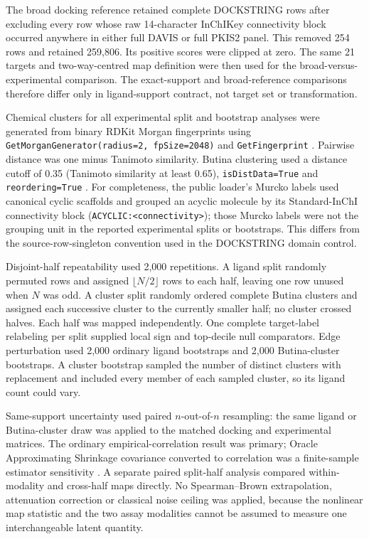 The broad docking reference retained complete DOCKSTRING rows after excluding
every row whose raw 14-character InChIKey connectivity block occurred anywhere
in either full DAVIS or full PKIS2 panel.  This removed 254 rows and retained
259,806.  Its positive scores were clipped at zero.  The same 21 targets and
two-way-centred map definition were then used for the broad-versus-experimental
comparison.  The exact-support and broad-reference comparisons therefore
differ only in ligand-support contract, not target set or transformation.

Chemical clusters for all experimental split and bootstrap analyses were
generated from binary RDKit Morgan fingerprints using
\texttt{GetMorganGenerator(radius=2, fpSize=2048)} and
\texttt{GetFingerprint} \cite{morgan1965,rogers2010,rdkit2025}.  Pairwise
distance was one minus Tanimoto similarity.  Butina clustering used a distance
cutoff of 0.35 (Tanimoto similarity at least 0.65),
\texttt{isDistData=True} and \texttt{reordering=True} \cite{butina1999}.  For
completeness, the public loader's Murcko labels used canonical cyclic scaffolds
and grouped an acyclic molecule by its Standard-InChI connectivity block
(\texttt{ACYCLIC:<connectivity>}); those Murcko labels were not the grouping
unit in the reported experimental splits or bootstraps.  This differs from the
source-row-singleton convention used in the DOCKSTRING domain control.

Disjoint-half repeatability used 2,000 repetitions.  A ligand split randomly
permuted rows and assigned $\lfloor N/2\rfloor$ rows to each half, leaving one
row unused when $N$ was odd.  A cluster split randomly ordered complete Butina
clusters and assigned each successive cluster to the currently smaller half;
no cluster crossed halves.  Each half was mapped independently.  One complete
target-label relabeling per split supplied local sign and top-decile null
comparators.  Edge perturbation used 2,000 ordinary ligand bootstraps and 2,000
Butina-cluster bootstraps.  A cluster bootstrap sampled the number of distinct
clusters with replacement and included every member of each sampled cluster,
so its ligand count could vary.

Same-support uncertainty used paired $n$-out-of-$n$ resampling: the same ligand
or Butina-cluster draw was applied to the matched docking and experimental
matrices.  The ordinary empirical-correlation result was primary; Oracle
Approximating Shrinkage covariance converted to correlation was a finite-sample
estimator sensitivity \cite{chen2010}.  A separate paired split-half analysis
compared within-modality and cross-half maps directly.  No Spearman--Brown
extrapolation, attenuation correction or classical noise ceiling was applied,
because the nonlinear map statistic and the two assay modalities cannot be
assumed to measure one interchangeable latent quantity.

